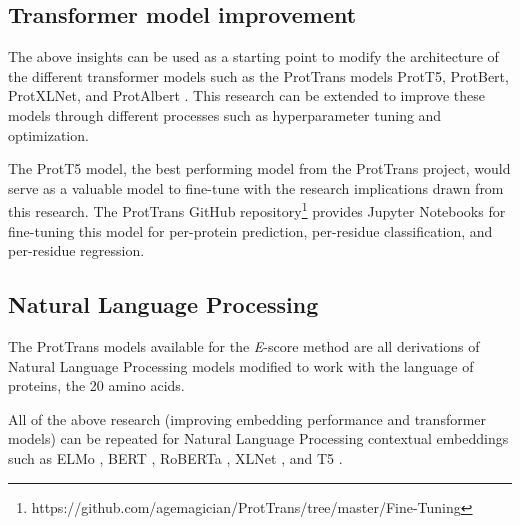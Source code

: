 \documentclass[
	letterpaper, %
	10pt, %
]{journalArticle}
\begin{document}
\subsection{Transformer model improvement}

The above insights can be used as a starting point to modify the architecture of the different transformer \autocite{Vaswani:2017} models such as the ProtTrans models ProtT5, ProtBert, ProtXLNet, and ProtAlbert \autocite{Elnaggar:2021}. This research can be extended to improve these models through different processes such as hyperparameter tuning and optimization.

The ProtT5 model, the best performing model from the ProtTrans project, would serve as a valuable model to fine-tune with the research implications drawn from this research. The ProtTrans GitHub repository\footnote{https://github.com/agemagician/ProtTrans/tree/master/Fine-Tuning} provides Jupyter Notebooks for fine-tuning this model for per-protein prediction, per-residue classification, and per-residue regression.

\subsection{Natural Language Processing}
The ProtTrans models available for the \textit{E}-score method are all derivations of Natural Language Processing models modified to work with the language of proteins, the 20 amino acids.

All of the above research (improving embedding performance and transformer models) can be repeated for Natural Language Processing contextual embeddings such as ELMo \autocite{Peters:2018}, BERT \autocite{Devlin:2018}, RoBERTa \autocite{Liu:2019}, XLNet \autocite{Yang:2022}, and T5 \autocite{Raffel:2020}. 

\printbibliography %

\end{document}
